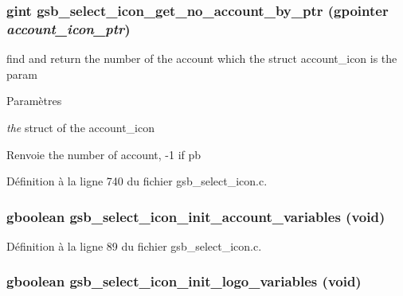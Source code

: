 \subsubsection[{gsb\_\-select\_\-icon\_\-get\_\-no\_\-account\_\-by\_\-ptr}]{\setlength{\rightskip}{0pt plus 5cm}gint gsb\_\-select\_\-icon\_\-get\_\-no\_\-account\_\-by\_\-ptr (gpointer {\em account\_\-icon\_\-ptr})}\label{gsb__select__icon_8c_a6f0518fa0e7946b6ec40427f21375fac}
find and return the number of the account which the struct account\_\-icon is the param


\begin{DoxyParams}{Paramètres}
\item[{\em the}]struct of the account\_\-icon\end{DoxyParams}
\begin{DoxyReturn}{Renvoie}
the number of account, -\/1 if pb 
\end{DoxyReturn}


Définition à la ligne 740 du fichier gsb\_\-select\_\-icon.c.

\subsubsection[{gsb\_\-select\_\-icon\_\-init\_\-account\_\-variables}]{\setlength{\rightskip}{0pt plus 5cm}gboolean gsb\_\-select\_\-icon\_\-init\_\-account\_\-variables (void)}\label{gsb__select__icon_8c_aa828e28bd2c8224635f73fa4135a918c}


Définition à la ligne 89 du fichier gsb\_\-select\_\-icon.c.

\subsubsection[{gsb\_\-select\_\-icon\_\-init\_\-logo\_\-variables}]{\setlength{\rightskip}{0pt plus 5cm}gboolean gsb\_\-select\_\-icon\_\-init\_\-logo\_\-variables (void)}\label{gsb__select__icon_8c_a7630934bc2c88657cd100b78d92cffdf}


